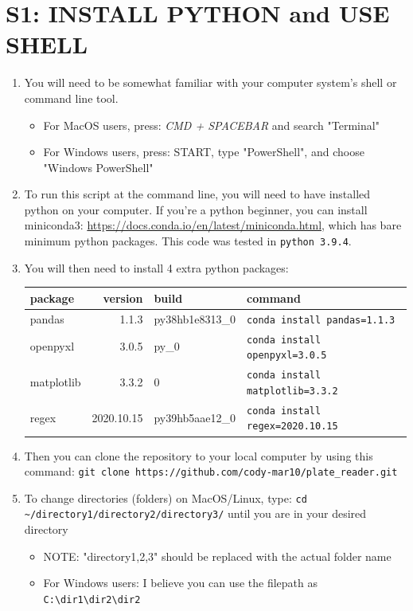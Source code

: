 \documentclass[12pt]{article}
\begin{document}
\section*{S1: INSTALL PYTHON and USE SHELL}
\label{sec:org3bac582}
\begin{enumerate}
\item You will need to be somewhat familiar with your computer system's shell or command line tool.
\begin{itemize}
\item For MacOS users, press: \emph{CMD + SPACEBAR} and search "Terminal"
\item For Windows users, press: START, type "PowerShell", and choose "Windows PowerShell"
\end{itemize}

\item To run this script at the command line, you will need to have installed python on your computer. If you're a python beginner, you can install miniconda3: \url{https://docs.conda.io/en/latest/miniconda.html}, which has bare minimum python packages. This code was tested in \texttt{python 3.9.4}.

\item You will then need to install 4 extra python packages:
\begin{center}
\begin{tabular}{lrll}
package & version & build & command\\
\hline
pandas & 1.1.3 & py38hb1e8313\_0 & \texttt{conda install pandas=1.1.3}\\
openpyxl & 3.0.5 & py\_0 & \texttt{conda install openpyxl=3.0.5}\\
matplotlib & 3.3.2 & 0 & \texttt{conda install matplotlib=3.3.2}\\
regex & 2020.10.15 & py39hb5aae12\_0 & \texttt{conda install regex=2020.10.15}\\
\end{tabular}
\end{center}

\item Then you can clone the repository to your local computer by using this command: \texttt{git clone https://github.com/cody-mar10/plate\_reader.git}

\item To change directories (folders) on MacOS/Linux, type: \texttt{cd \textasciitilde{}/directory1/directory2/directory3/} until you are in your desired directory
\begin{itemize}
\item NOTE: "directory1,2,3" should be replaced with the actual folder name
\item For Windows users: I believe you can use the filepath as \texttt{C:\textbackslash{}dir1\textbackslash{}dir2\textbackslash{}dir2}
\end{itemize}


\end{enumerate}
\end{document}
